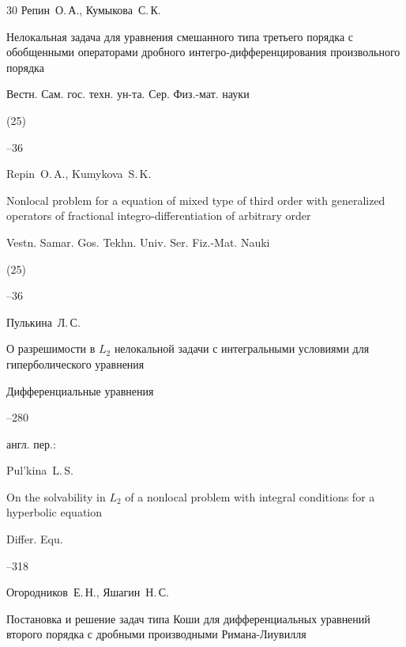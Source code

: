 \begin{thebibliography}{30}
\by Репин~О.\,А., Кумыкова~С.\,К.

\paper Нелокальная задача для уравнения смешанного типа третьего порядка с обобщенными операторами дробного интегро-дифференцирования произвольного порядка

\jour Вестн. Сам. гос. техн. ун-та. Сер. Физ.-мат. науки


(25)

--36

\misctransl

\by Repin~O.\,A., Kumykova~S.\,K.

\paper Nonlocal problem for a equation of mixed type of third order with generalized operators of fractional integro-differentiation of arbitrary order

\jour Vestn. Samar. Gos. Tekhn. Univ. Ser. Fiz.-Mat. Nauki


(25)

--36




\by Пулькина~Л.\,С.

\paper О разрешимости в $L_2$ нелокальной задачи с интегральными условиями для гиперболического уравнения

\jour Дифференциальные уравнения




--280

\transl англ. пер.:~

\by Pul'kina~L.\,S. 

\paper On the solvability in $L_2$ of a nonlocal problem with integral conditions for a hyperbolic equation

\jour Differ. Equ.




–318 






\by Огородников~Е.\,Н., Яшагин~Н.\,С.

\paper Постановка и решение задач  типа Коши для дифференциальных уравнений второго порядка с дробными производными Римана-Лиувилля


\end{thebibliography}
